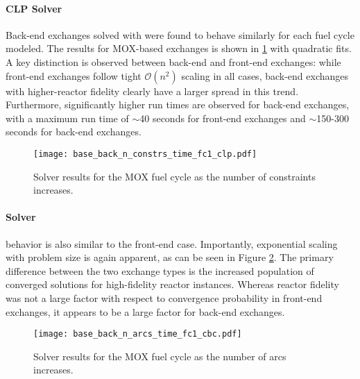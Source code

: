 \paragraph{CLP Solver}

Back-end exchanges solved with \clp were found to behave similarly for each fuel
cycle modeled. The results for MOX-based exchanges is shown in
\ref{fig:base_back_n_constrs_time_fc1_clp} with quadratic fits. A key distinction
is observed between back-end and front-end exchanges: while front-end exchanges
follow tight $\mathcal{O}(n^2)$ scaling in all cases, back-end exchanges with
higher-reactor fidelity clearly have a larger spread in this trend. Furthermore,
significantly higher run times are observed for back-end exchanges, with a
maximum run time of $\sim$40 seconds for front-end exchanges and $\sim$150-300
seconds for back-end exchanges.

\begin{figure}[h!]
  \begin{center}
    \texttt{[image: base\_back\_n\_constrs\_time\_fc1\_clp.pdf]}
    \caption{
      \label{fig:base_back_n_constrs_time_fc1_clp}
      \clp Solver results for the MOX fuel cycle as the number of constraints
      increases.      
    }
  \end{center}
\end{figure}

\paragraph{\cbc Solver}

\cbc behavior is also similar to the front-end case. Importantly, exponential
scaling with problem size is again apparent, as can be seen in Figure
\ref{fig:base_back_n_arcs_time_fc1_cbc}. The primary difference between the two
exchange types is the increased population of converged solutions for
high-fidelity reactor instances. Whereas reactor fidelity was not a large factor
with respect to convergence probability in front-end exchanges, it appears to be
a large factor for back-end exchanges.
 
\begin{figure}[h!]
  \begin{center}
    \texttt{[image: base\_back\_n\_arcs\_time\_fc1\_cbc.pdf]}
    \caption{
      \label{fig:base_back_n_arcs_time_fc1_cbc}
      \cbc Solver results for the MOX fuel cycle as the number of arcs
      increases.      
    }
  \end{center}
\end{figure}

